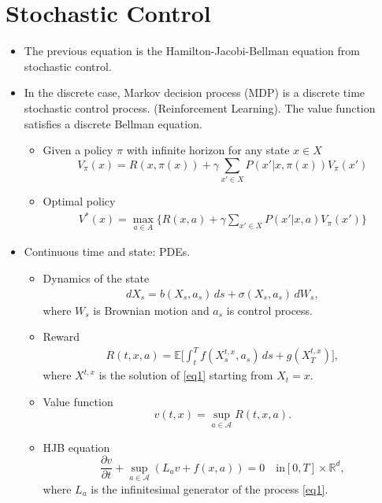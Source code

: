 \documentclass{beamer}
\begin{document}
\section{Stochastic Control}
\begin{frame}
\begin{itemize}
\item The previous equation is the {\color{red}Hamilton-Jacobi-Bellman} equation from stochastic control. 
\item In the discrete case, Markov decision process (MDP) is a discrete time stochastic control process. (Reinforcement Learning).   The value function satisfies a discrete Bellman equation.
\begin{itemize}
\item Given a policy $\pi$ with infinite horizon for any state $x\in X$
\begin{equation*}
V_\pi(x) = R(x,\pi(x)) + \gamma\sum_{x'\in X}P(x'|x,\pi(x))V_{\pi}(x')
\end{equation*}
\item Optimal policy
\begin{align*}
V^\ast(x) = \max_{a\in A}\{R(x,a) + \gamma\sum_{x'\in X}P(x'|x,a)V_{\pi}(x')\}
\end{align*}
\end{itemize}

\end{itemize} 
\end{frame}

\begin{frame}
\begin{itemize}
\item Continuous time and state: PDEs. 
\begin{itemize}
\item Dynamics of the state
\begin{align}\label{eq1}
dX_s = b(X_s,a_s)\,ds + \sigma(X_s,a_s)\,dW_s,
\end{align}
where $W_s$ is Brownian motion and $a_s$ is control process.
\item Reward 
\begin{align*}
R(t,x,a) = \mathbb{E}\big[\int_t^Tf(X_s^{t,x},a_s)\,ds + g(X_T^{t,x})\big],
\end{align*}
where $X^{t,x}$ is the solution of \eqref{eq1} starting from $X_t = x$.
\item Value function 
$$v(t,x) = \sup_{a\in \mathcal{A}}R(t,x,a).$$
\item HJB equation 
$$\frac{\partial v}{\partial t} + \sup_{a\in \mathcal{A}}(L_a v + f(x,a)) = 0\quad \text{in} [0,T]\times \mathbb{R}^d,$$
where $L_a$ is the infinitesimal generator of the process \eqref{eq1}. 
\end{itemize}
\end{itemize}

\end{frame}
\end{document}

